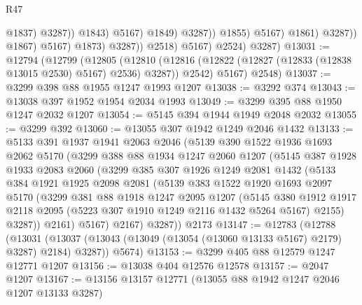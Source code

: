 \begin{lexlean}{R47}
\begin{coremodule}
                                                @1837)
                                              @3287))
                                          @1843)
                                        @5167)
                                      @1849)
                                    @3287))
                                @1855)
                              @5167)
                            @1861)
                          @3287))
                      @1867)
                    @5167)
                  @1873)
                @3287))
            @2518)
          @5167)
        @2524)
      @3287)
@13031 := @12794
    (@12799
      (@12805
        (@12810 (@12816 (@12822 (@12827 (@12833 (@12838 @13015 @2530) @5167) @2536) @3287)) @2542)
        @5167)
      @2548)
@13037 := @3299 @398 @88 @1955 @1247 @1993 @1207
@13038 := @3292 @374
@13043 := @13038 @397 @1952 @1954 @2034 @1993
@13049 := @3299 @395 @88 @1950 @1247 @2032 @1207
@13054 := @5145 @394 @1944 @1949 @2048 @2032
@13055 := @3299 @392
@13060 := @13055 @307 @1942 @1249 @2046 @1432
@13133 := @5133
    @391
    @1937
    @1941
    @2063
    @2046
    (@5139
      @390
      @1522
      @1936
      @1693
      @2062
      @5170
      (@3299
        @388
        @88
        @1934
        @1247
        @2060
        @1207
        (@5145
          @387
          @1928
          @1933
          @2083
          @2060
          (@3299
            @385
            @307
            @1926
            @1249
            @2081
            @1432
            (@5133
              @384
              @1921
              @1925
              @2098
              @2081
              (@5139
                @383
                @1522
                @1920
                @1693
                @2097
                @5170
                (@3299
                  @381
                  @88
                  @1918
                  @1247
                  @2095
                  @1207
                  (@5145
                    @380
                    @1912
                    @1917
                    @2118
                    @2095
                    (@5223 @307 @1910 @1249 @2116 @1432 @5264 @5167)
                    @2155)
                  @3287))
              @2161)
            @5167)
          @2167)
        @3287))
    @2173
@13147 := @12783
    (@12788
      (@13031 (@13037 (@13043 (@13049 (@13054 (@13060 @13133 @5167) @2179) @3287) @2184) @3287))
      @5674)
@13153 := @3299 @405 @88 @12579 @1247 @12771 @1207
@13156 := @13038 @404 @12576 @12578
@13157 := @2047 @1207
@13167 := @13156 @13157 @12771 (@13055 @88 @1942 @1247 @2046 @1207 @13133 @3287)

\end{coremodule}
\end{lexlean}
